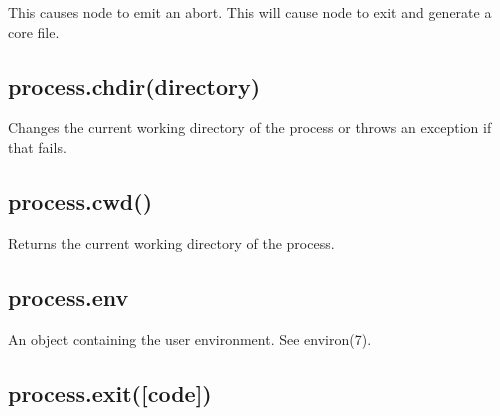 This causes node to emit an abort. This will cause node to exit and
generate a core file.

\subsection{process.chdir(directory)}\label{process.chdirdirectory}

Changes the current working directory of the process or throws an
exception if that fails.

\begin{Shaded}
\begin{Highlighting}[]
\NormalTok{(} \NormalTok{+ }\NormalTok{());}
 \NormalTok{\{}
  \NormalTok{(}\NormalTok{);}
  \NormalTok{(} \NormalTok{+ }\NormalTok{());}
\NormalTok{\}}
 
  \NormalTok{(} 
\NormalTok{\}}
\end{Highlighting}
\end{Shaded}

\subsection{process.cwd()}\label{process.cwd}

Returns the current working directory of the process.

\begin{Shaded}
\begin{Highlighting}[]
\NormalTok{(} \NormalTok{+ }\NormalTok{());}
\end{Highlighting}
\end{Shaded}

\subsection{process.env}\label{process.env}

An object containing the user environment. See environ(7).

\subsection{process.exit({[}code{]})}\label{process.exitcode}

